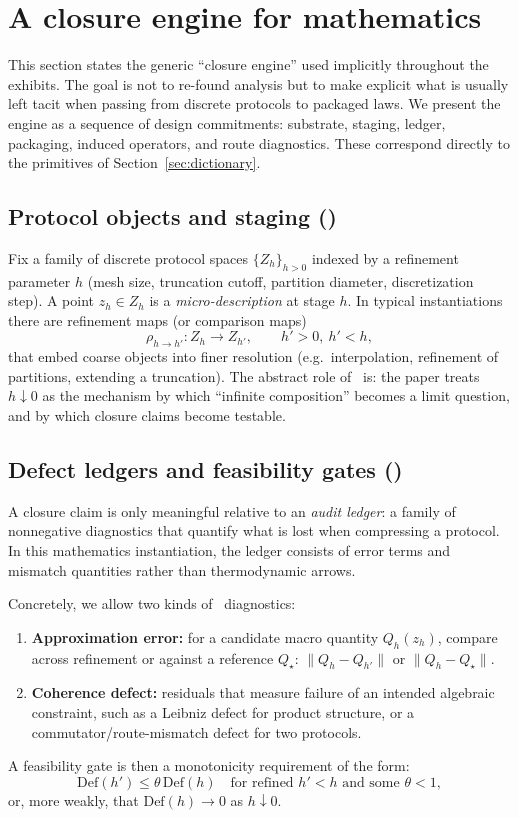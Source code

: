\section{A closure engine for mathematics}
\label{sec:packaging-engine}

This section states the generic ``closure engine'' used implicitly throughout the exhibits.
The goal is not to re-found analysis but to make explicit what is usually left tacit when passing from discrete protocols to packaged laws.
We present the engine as a sequence of design commitments: substrate, staging, ledger, packaging, induced operators, and route diagnostics.
These correspond directly to the \SBT primitives of Section~\ref{sec:dictionary}.

\subsection{Protocol objects and staging (\Pfour)}
Fix a family of discrete protocol spaces $\{Z_h\}_{h>0}$ indexed by a refinement parameter $h$ (mesh size, truncation cutoff, partition diameter, discretization step).
A point $z_h\in Z_h$ is a \emph{micro-description} at stage $h$.
In typical instantiations there are refinement maps (or comparison maps)
\[
\rho_{h\to h'}:Z_h \to Z_{h'}, \qquad h'>0,\ h'<h,
\]
that embed coarse objects into finer resolution (e.g.\ interpolation, refinement of partitions, extending a truncation).
The abstract role of \Pfour\ is: the paper treats $h\downarrow 0$ as the mechanism by which ``infinite composition'' becomes a limit question, and by which closure claims become testable.

\subsection{Defect ledgers and feasibility gates (\Psix)}
A closure claim is only meaningful relative to an \emph{audit ledger}:
a family of nonnegative diagnostics that quantify what is lost when compressing a protocol.
In this mathematics instantiation, the ledger consists of error terms and mismatch quantities rather than thermodynamic arrows.

Concretely, we allow two kinds of \Psix\ diagnostics:
\begin{enumerate}
  \item \textbf{Approximation error:} for a candidate macro quantity $Q_h(z_h)$, compare across refinement or against a reference $Q_\star$:
  $\|Q_h-Q_{h'}\|$ or $\|Q_h-Q_\star\|$.
  \item \textbf{Coherence defect:} residuals that measure failure of an intended algebraic constraint, such as a Leibniz defect for product structure, or a commutator/route-mismatch defect for two protocols.
\end{enumerate}
A feasibility gate is then a monotonicity requirement of the form:
\[
\mathrm{Def}(h') \le \theta\,\mathrm{Def}(h)
\quad\text{for refined }h'<h\text{ and some }\theta<1,
\]
or, more weakly, that $\mathrm{Def}(h)\to 0$ as $h\downarrow 0$.

